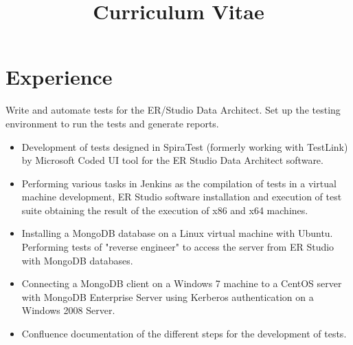 \documentclass[11pt,a4paper,sans]{moderncv}
\title{Curriculum Vitae}               %
\begin{document}
\maketitle

\section{Experience}

%
%

{Write and automate tests for the ER/Studio Data Architect. Set up the testing environment to run the tests and generate reports. 
\newline{}\newline{}
\begin{itemize}
\item Development of tests designed in SpiraTest (formerly working with TestLink) by Microsoft Coded UI tool for the ER Studio Data Architect software.
\item Performing various tasks in Jenkins as the compilation of tests in a virtual machine development, ER Studio software installation and execution of test suite obtaining the result of the execution of x86 and x64 machines.
\item Installing a MongoDB database on a Linux virtual machine with Ubuntu. Performing tests of "reverse engineer" to access the server from ER Studio with MongoDB databases.
\item Connecting a MongoDB client on a Windows 7 machine to a CentOS server with MongoDB Enterprise Server using Kerberos authentication on a Windows 2008 Server.
\item Confluence documentation of the different steps for the development of tests.
\end{itemize}}
\end{document}
